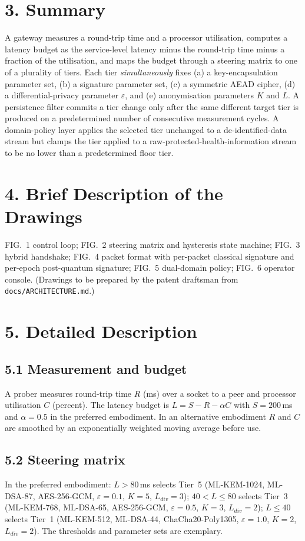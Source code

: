 \documentclass[11pt,a4paper]{article}
\begin{document}
\section*{3. Summary}
A gateway measures a round-trip time and a processor utilisation, computes a latency budget as the service-level latency minus the round-trip time minus a fraction of the utilisation, and maps the budget through a steering matrix to one of a plurality of tiers. Each tier \emph{simultaneously} fixes (a) a key-encapsulation parameter set, (b) a signature parameter set, (c) a symmetric AEAD cipher, (d) a differential-privacy parameter $\varepsilon$, and (e) anonymisation parameters $K$ and $L$. A persistence filter commits a tier change only after the same different target tier is produced on a predetermined number of consecutive measurement cycles. A domain-policy layer applies the selected tier unchanged to a de-identified-data stream but clamps the tier applied to a raw-protected-health-information stream to be no lower than a predetermined floor tier.

\section*{4. Brief Description of the Drawings}
FIG.~1 control loop; FIG.~2 steering matrix and hysteresis state machine; FIG.~3 hybrid handshake; FIG.~4 packet format with per-packet classical signature and per-epoch post-quantum signature; FIG.~5 dual-domain policy; FIG.~6 operator console. (Drawings to be prepared by the patent draftsman from \texttt{docs/ARCHITECTURE.md}.)

\section*{5. Detailed Description}
\subsection*{5.1 Measurement and budget}
A prober measures round-trip time $R$ (ms) over a socket to a peer and processor utilisation $C$ (percent). The latency budget is $L=S-R-\alpha C$ with $S=200$\,ms and $\alpha=0.5$ in the preferred embodiment. In an alternative embodiment $R$ and $C$ are smoothed by an exponentially weighted moving average before use.

\subsection*{5.2 Steering matrix}
In the preferred embodiment: $L>80$\,ms selects Tier~5 (ML-KEM-1024, ML-DSA-87, AES-256-GCM, $\varepsilon=0.1$, $K=5$, $L_{div}=3$); $40<L\le80$ selects Tier~3 (ML-KEM-768, ML-DSA-65, AES-256-GCM, $\varepsilon=0.5$, $K=3$, $L_{div}=2$); $L\le 40$ selects Tier~1 (ML-KEM-512, ML-DSA-44, ChaCha20-Poly1305, $\varepsilon=1.0$, $K=2$, $L_{div}=2$). The thresholds and parameter sets are exemplary.
\end{document}
